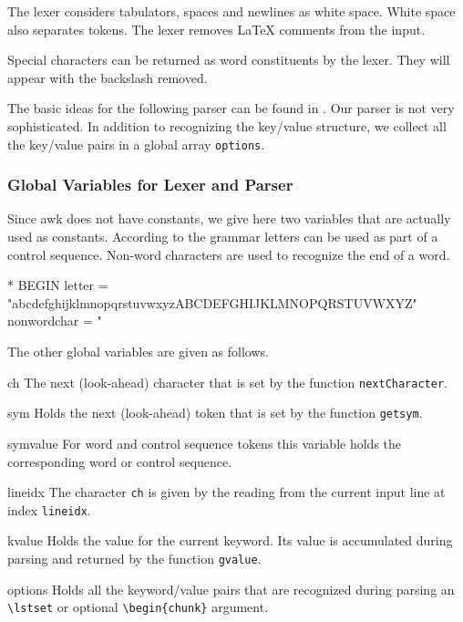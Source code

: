 \documentclass[a4paper]{article} %
\newcommand{\packagename}[1]{{\normalfont\sffamily#1}}
\newenvironment{ttdescription}
  {\list{}{\labelwidth0pt \itemindent-\leftmargin
      \def\makelabel##1{\hspace\labelsep
        \normalfont\ttfamily ##1:}}}
  {\endlist}
\begin{document}
The lexer considers tabulators, spaces and newlines as white space.
White space also separates tokens. The lexer removes \LaTeX{} comments
from the input.

Special characters can be returned as word constituents by the lexer.
They will appear with the backslash removed.

The basic ideas for the following parser can be found in
\cite[pp.~9--20]{Wirth:2005}. Our parser is not very sophisticated. In
addition to recognizing the key/value structure, we collect all the
key/value pairs in a global array \texttt{options}.

\subsubsection{Global Variables for Lexer and Parser}

Since \packagename{awk} does not have constants, we give here two
variables that are actually used as constants. According to the
grammar letters can be used as part of a control sequence. Non-word
characters are used to recognize the end of a word.
\begin{chunk}{*}
BEGIN {
  letter      = "abcdefghijklmnopqrstuvwxyzABCDEFGHIJKLMNOPQRSTUVWXYZ"
  nonwordchar = " %
}
\end{chunk}

The other global variables are given as follows.
\begin{ttdescription}
\item[ch] The next (look-ahead) character that is set by the function
  \texttt{nextCharacter}.

\item[sym] Holds the next (look-ahead) token that is set by the
  function \texttt{getsym}.

\item[symvalue] For word and control sequence tokens this variable
  holds the corresponding word or control sequence.

\item[lineidx] The character \texttt{ch} is given by the reading from
  the current input line at index \texttt{lineidx}.

\item[kvalue] Holds the value for the current keyword. Its value is
  accumulated during parsing and returned by the function
  \texttt{gvalue}.

\item[options] Holds all the keyword/value pairs that are recognized
  during parsing an \verb'\'\verb'lstset' or optional
  \verb'\'\verb'begin{chunk}' argument.

\end{ttdescription}
\end{document}
